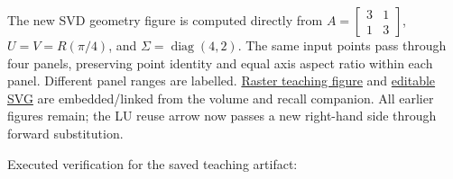The new SVD geometry figure is computed directly from \(A=\begin{bmatrix}3&1\\1&3\end{bmatrix}\), \(U=V=R(\pi/4)\), and \(\Sigma=\operatorname{diag}(4,2)\). The same input points pass through four panels, preserving point identity and equal axis aspect ratio within each panel. Different panel ranges are labelled. \href{../current/Assets/Print/b681e335dbaa5c1c27f9d47821582f982e787aff8b237276782bfc38d8631fb1.png}{Raster teaching figure} and \href{../current/Assets/Print/3491f9bdb1d7f300619c0d11a33ded7f3b3adfdc803929f353124f6903c784b4.svg}{editable SVG} are embedded/linked from the volume and recall companion. All earlier figures remain; the LU reuse arrow now passes a new right-hand side through forward substitution.

Executed verification for the saved teaching artifact:

